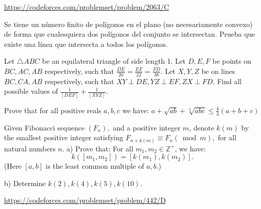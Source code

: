 \documentclass[11pt]{scrartcl}
\begin{document}
\begin{problem}[CF 2063C]
\url{https://codeforces.com/problemset/problem/2063/C}
\end{problem}
\begin{problem}
Se tiene un número finito de polígonos en el plano (no necesariamente convexo) de forma que cualesquiera dos polígonos del conjunto se intersectan. Prueba que existe una línea que intersecta a todos los polígonos.
\end{problem}
\begin{problem}[China 2023/2]
Let $\triangle ABC$ be an equilateral triangle of side length 1. Let $D,E,F$ be points on $BC,AC,AB$ respectively, such that $\frac{DE}{20} = \frac{EF}{22} = \frac{FD}{38}$. Let $X,Y,Z$ be on lines $BC,CA,AB$ respectively, such that $XY\perp DE, YZ\perp EF, ZX\perp FD$. Find all possible values of $\frac{1}{[DEF]} + \frac{1}{[XYZ]}$.
\end{problem}
\begin{problem}
Prove that for all positive reals $a, b,c$ we have: $a +\sqrt{ab}+ \sqrt[3]{abc}\le \frac43 (a + b + c)$
\end{problem}
\begin{problem}
Given Fibonacci sequence $(F_n),$ and a positive integer $m$, denote $k(m)$ by the smallest positive integer satisfying $F_{n+k(m)}\equiv F_n(\bmod m),$ for all natural numbers $n$.
a) Prove that: For all $m_1,m_2\in \mathbb{Z^+}$, we have:$$k([m_1,m_2])=[k(m_1),k(m_2)].$$(Here $[a,b]$ is the least common multiple of $a,b.$)

b) Determine $k(2),k(4),k(5),k(10).$
\end{problem}
\begin{problem}[CF 442D]
\url{https://codeforces.com/problemset/problem/442/D}
\end{problem}
\end{document}
